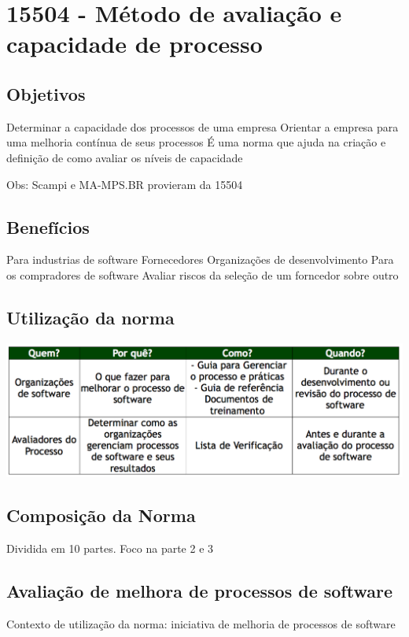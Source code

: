 \documentclass{article}
\begin{document}
\section{15504 - Método de avaliação e capacidade de processo } \date{28 de Abril de 2014}

\subsection{Objetivos}
	Determinar a capacidade dos processos de uma empresa
	Orientar a empresa para uma melhoria contínua de seus processos
	É uma norma que ajuda na criação e definição de como avaliar os níveis de capacidade
	
	Obs: Scampi e MA-MPS.BR provieram da 15504
	
\subsection{Benefícios}
	Para industrias de software
		Fornecedores 
		Organizações de desenvolvimento
	Para os compradores de software	
		Avaliar riscos da seleção de um forncedor sobre outro

\subsection{Utilização da norma}

	\includegraphics[scale=0.25]{utilizacao_norma}
\subsection{Composição da Norma}

	Dividida em 10 partes. 
	Foco na parte 2 e 3

\subsection{Avaliação de melhora de processos de software}

	Contexto de utilização da norma: iniciativa de melhoria de processos de software
	
\end{document}
